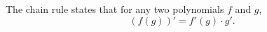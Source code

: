 The chain rule states that for any two polynomials $f$ and $g$,
$$\left(f(g)\right)' = f'(g) \cdot g'.$$
